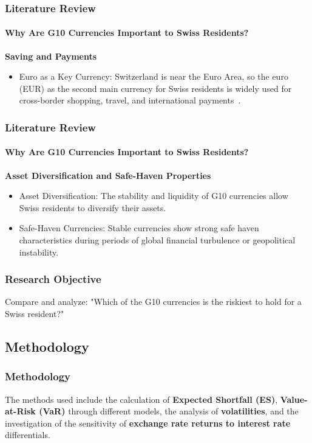 \documentclass[10pt]{beamer}
\begin{document}
\begin{frame}
\frametitle{Literature Review}
\framesubtitle{Why Are G10 Currencies Important to Swiss Residents?}
\textbf{Saving and Payments}
\begin{itemize}
    \item Euro as a Key Currency: Switzerland is near the Euro Area, so the euro (EUR) as the second main currency for Swiss residents is widely used for cross-border shopping, travel, and international payments~\cite{sif_imf_reports}.
\end{itemize}
\end{frame}
\begin{frame}
\frametitle{Literature Review}
\framesubtitle{Why Are G10 Currencies Important to Swiss Residents?}
\textbf{Asset Diversification and Safe-Haven Properties}   
\begin{itemize}
    \item Asset Diversification: The stability and liquidity of G10 currencies allow Swiss residents to diversify their assets. ~\cite{ito2020currency}
    \item Safe-Haven Currencies: Stable currencies show strong safe haven characteristics during periods of global financial turbulence or geopolitical instability.~\cite{ranaldo2010safe}
\end{itemize}
\end{frame}
\begin{frame}
\frametitle{Research Objective}
Compare and analyze: "Which of the G10 currencies is the riskiest to hold for a Swiss resident?"
\end{frame}
\begin{frame}
\section{Methodology}
\frametitle{Methodology}
The methods used include the calculation of \textbf{Expected Shortfall (ES)}, \textbf{Value-at-Risk (VaR)} through different models, the analysis of \textbf{volatilities}, and the investigation of the sensitivity of \textbf{exchange rate returns to interest rate} differentials.
\end{frame}
\end{document}
